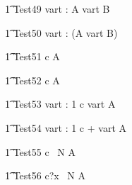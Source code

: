 
\begin{circusaction}
   \t1 Test49 \circdef \circvres vart : \nat  \circspot  A \circseq \circwait  vart  B \\
\end{circusaction}

\begin{circusaction}
   \t1 Test50 \circdef \circvres vart : \nat  \circspot  (A \circseq \circwait  vart  B) \\
\end{circusaction}


\begin{circusaction}
   \t1 Test51 \circdef c \then  {} \rcirctime A \\
\end{circusaction}

\begin{circusaction}
   \t1 Test52 \circdef c \then  {}  \rcirctime A \\
\end{circusaction}

\begin{circusaction}
   \t1 Test53 \circdef \circvres vart : 1   \circspot c \then  \lcirctime vart \rcirctime A \\
\end{circusaction}

\begin{circusaction}
   \t1 Test54 \circdef \circvres vart : 1   \circspot c \then  {} + vart \rcirctime A \\
\end{circusaction}



\begin{circusaction}
   \t1 Test55 \circdef c \circat~N  \then A \\
\end{circusaction}

\begin{circusaction}
   \t1 Test56 \circdef c?x \circat~N  \then A \\
\end{circusaction}

